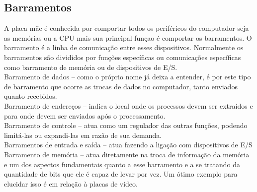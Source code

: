 \subsection{Barramentos}

A placa mãe é conhecida por comportar todos os periféricos do computador seja as memórias ou a CPU mais sua principal funçao é comportar os barramentos. O barramento é a linha de comunicação entre esses dispositivos. Normalmente os barramentos são divididos por funções específicas ou comunicações específicas como barramento de memória ou de dispositivos de E/S.\\
Barramento de dados – como o próprio nome já deixa a entender, é por este tipo de barramento que ocorre as trocas de dados no computador, tanto enviados quanto recebidos.\\
Barramento de endereços – indica o local onde os processos devem ser extraídos e para onde devem ser enviados após o processamento.\\
Barramento de controle – atua como um regulador das outras funções, podendo limitá-las ou expandi-las em razão de sua demanda.\\
Barramentos de entrada e saída – atua fazendo a ligação com dispositivos de E/S\\
Barramento de memória – atua diretamente na troca de informação da memória e um dos aspectos fundamentais quanto a esse  barramento e a se tratando da quantidade de bits que ele é capaz de levar por vez. Um ótimo exemplo para elucidar isso é em relação à placas de vídeo.
